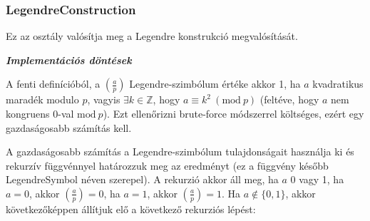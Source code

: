 \documentclass[hidelinks, 12pt]{article}
\begin{document}
\subsubsection*{LegendreConstruction}
Ez az osztály valósítja meg a Legendre konstrukció megvalósítását.

\textbf{\textit{Implementációs döntések}}

A fenti definícióból, a $\left({\frac{a}{p}}\right)$ Legendre-szimbólum értéke akkor 1, ha $a$ kvadratikus maradék modulo $p$, vagyis $\exists k \in \mathbb{Z}$, hogy $a \equiv k^2\ (\textrm{mod}\ p)$ (feltéve, hogy $a$ nem kongruens 0-val $\textrm{mod}\ p$). Ezt ellenőrizni brute-force módszerrel költséges, ezért egy gazdaságosabb számítás kell.

A gazdaságosabb számítás a Legendre-szimbólum tulajdonságait használja ki és rekurzív függvénnyel határozzuk meg az eredményt (ez a függvény később LegendreSymbol néven szerepel). A rekurzió akkor áll meg, ha $a$ 0 vagy 1, ha $a = 0$, akkor $\left({\frac{a}{p}}\right) = 0$, ha $a=1$, akkor $\left({\frac{a}{p}}\right) = 1$. Ha $a \not\in \{0,1\}$, akkor következőképpen állítjuk elő a következő rekurziós lépést:
\end{document}
